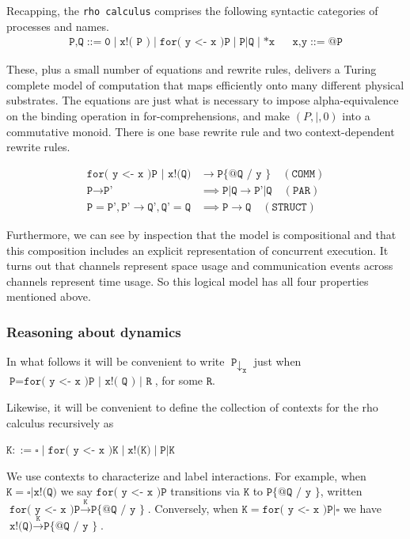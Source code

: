 \documentclass{article}
\newcommand{\parcomp}{\mid}
\newcommand{\code}[1]{\texttt{#1}}
\newcommand{\tcode}[1]{\texttt{#1}}
\begin{document}
Recapping, the \code{rho calculus} comprises the following syntactic categories of processes and names.
\begin{align*}
  \code{P,Q} \;\code{::=}\; \code{0} \mid \code{x!( P )} \mid \code{for( y <- x )P} \mid \code{P|Q} \mid \code{*x} & & \code{x,y} \;\code{::=}\; \code{@P}
\end{align*}

These, plus a small number of equations and rewrite rules, delivers a Turing complete model of computation that maps efficiently onto many different physical substrates. The equations are just what is necessary to impose alpha-equivalence on the binding operation in for-comprehensions, and make $(P, \parcomp, 0)$ into a commutative monoid. There is one base rewrite rule and two context-dependent rewrite rules.

\begin{align*}
  \code{for( y <- x )P | x!(Q)} &\rightarrow \code{P\{ @Q / y \}} \quad (\tcode{COMM}) \\
  \code{P} \rightarrow \code{P'} &\implies \code{P|Q} \rightarrow \code{P'|Q} \quad (\tcode{PAR}) \\
  \code{P} = \code{P'}, \code{P'} \rightarrow \code{Q'}, \code{Q'} = \code{Q} &\implies \code{P} \rightarrow \code{Q} \quad (\tcode{STRUCT})
\end{align*}

Furthermore, we can see by inspection that the model is compositional and that this composition includes an explicit representation of concurrent execution. It turns out that channels represent space usage and communication events across channels represent time usage. So this logical model has all four properties mentioned above.

\subsubsection{Reasoning about dynamics}

In what follows it will be convenient to write $\code{P}\downarrow_{\code{x}}$ just when $\code{P} = \code{for( y <- x )P | x!( Q ) | R}$, for some $\code{R}$.

Likewise, it will be convenient to define the collection of contexts for the rho calculus recursively as

$\code{K} ::= \square \mid \code{for( y <- x )K} \mid \code{x!(K)} \mid \code{P|K}$

We use contexts to characterize and label interactions. For example, when $\code{K} = \square\code{|x!(Q)}$ we say $\code{for( y <- x )P}$ transitions via $\code{K}$ to $\code{P\{ @Q / y \}}$, written $\code{for( y <- x )P} \xrightarrow{\code{K}} \code{P\{ @Q / y \}}$. Conversely, when $\code{K} = \code{for( y <- x )P|} \square$ we have $\code{x!(Q)}\xrightarrow{\code{K}} \code{P\{ @Q / y \}}$.
\end{document}
